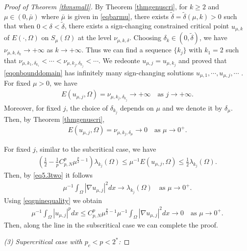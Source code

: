 \documentclass[10pt,a4paper]{amsart}
\newcommand{\la}{\lambda}
\begin{document}
\begin{proof}[Proof of Theorem \ref{thmsmall}]
By Theorem \ref{thmgenuscri}, for $k \geq 2$ and $\mu \in (0,\bar\mu)$ where $\bar\mu$ is given in \eqref{eqbarmu}, there exists $\tilde \delta = \tilde \delta(\mu,k) > 0$ such that when $0 < \delta < \tilde \delta$, there exists a sign-changing constrained critical point $u_{\mu,k}$ of $E(\cdot,\Omega)$ on $S_\mu(\Omega)$ at the level $\nu_{\mu,k,\delta}$. Choosing $\delta_k \in (0,\tilde \delta)$, we have $\nu_{\mu,k,\delta_k} \to +\infty$ as $k \to +\infty$. Thus we can find a sequence $\{k_j\}$ with $k_1 = 2$ such that $\nu_{\mu,k_1,\delta_{k_1}} < \cdots < \nu_{\mu,k_j,\delta_{k_j}} < \cdots$. We redeonte $u_{\mu,j} = u_{\mu,k_j}$ and proved that \eqref{eqonbounddomain} has infinitely many sign-changing solutions $u_{\mu,1}, \cdots, u_{\mu,j}, \cdots$ . For fixed $\mu > 0$, we have
\begin{align*}
	E(u_{\mu,j},\Omega) = \nu_{\mu,k_j,\delta_{k_j}} \to +\infty \quad \text{as } j \to +\infty.
\end{align*}
Moreover, for fixed $j$, the choice of $\delta_{k_j}$ depends on $\mu$ and we denote it by $\delta_\mu$. Then, by Theorem \ref{thmgenuscri},
\begin{align*}
	E(u_{\mu,j},\Omega) = \nu_{\mu,k_j,\delta_{\mu}} \to 0 \quad \text{as } \mu \to 0^+.
\end{align*}

For fixed $j$, similar to the subcritical case, we have
\begin{align*}
	\left( \frac12 - \frac1p C_{p,N}^p\mu^{\frac{p}{2}-1}\right)  \la_{k_j}(\Omega) \le \mu^{-1}E(u_{\mu,j},\Omega)  \le \frac12\la_{k_j}(\Omega).
\end{align*}
Then, by \eqref{eq5.3two} it follows
\begin{align*}
	\mu^{-1}\int_\Omega |\nabla u_{\mu,j}|^2dx \to \la_{k_j}(\Omega) \quad \text{as } \mu \to 0^+.
\end{align*}
Using \eqref{eqgninequality} we obtain
\begin{align*}
	\mu^{-1}\int_\Omega|u_{\mu,j}|^pdx \le C_{p,N}^p \mu^{\frac{p}{2}-1} \mu^{-1}\int_\Omega |\nabla u_{\mu,j}|^2dx \to 0 \quad \text{as } \mu \to 0^+.
\end{align*}
Then, along the line in the subscritical case we can complete the proof.

\vskip0.1in
\emph{(3) Supercritical case with $p_c < p < 2^*$:}


\end{proof}
\end{document}
